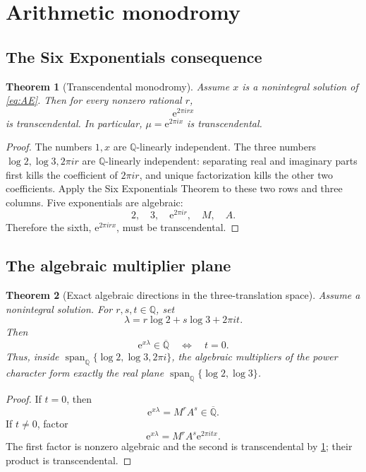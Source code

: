 \documentclass[11pt,oneside]{article}
\newtheorem{theorem}{Theorem}[section]
\theoremstyle{definition}
\theoremstyle{remark}
\newcommand{\Q}{\mathbb Q}
\newcommand{\Qbar}{\overline{\mathbb Q}}
\newcommand{\Span}{\operatorname{span}}
\newcommand{\e}{\mathrm e}
\begin{document}
\section{Arithmetic monodromy}

\subsection{The Six Exponentials consequence}

\begin{theorem}[Transcendental monodromy]
\label{thm:monodromy}
Assume \(x\) is a nonintegral solution of \eqref{eq:AE}.  Then for every nonzero rational \(r\),
\[
  \e^{2\pi i r x}
\]
is transcendental.  In particular, \(\mu=\e^{2\pi ix}\) is transcendental.
\end{theorem}

\begin{proof}
The numbers \(1,x\) are \(\Q\)-linearly independent.  The three numbers
\(\log2,\log3,2\pi ir\) are \(\Q\)-linearly independent: separating real and imaginary parts first kills the coefficient of \(2\pi ir\), and unique factorization kills the other two coefficients.  Apply the Six Exponentials Theorem to these two rows and three columns.  Five exponentials are algebraic:
\[
  2,\quad3,\quad \e^{2\pi ir},\quad M,\quad A.
\]
Therefore the sixth, \(\e^{2\pi irx}\), must be transcendental.
\end{proof}

\subsection{The algebraic multiplier plane}

\begin{theorem}[Exact algebraic directions in the three-translation space]
\label{thm:multiplier-plane}
Assume a nonintegral solution.  For \(r,s,t\in\Q\), set
\[
  \lambda=r\log2+s\log3+2\pi it.
\]
Then
\[
  \e^{x\lambda}\in\Qbar
  \quad\Longleftrightarrow\quad t=0.
\]
Thus, inside
\(\Span_{\Q}\{\log2,\log3,2\pi i\}\), the algebraic multipliers of the power character form exactly the real plane
\(\Span_{\Q}\{\log2,\log3\}\).
\end{theorem}

\begin{proof}
If \(t=0\), then
\[
  \e^{x\lambda}=M^rA^s\in\Qbar.
\]
If \(t\ne0\), factor
\[
  \e^{x\lambda}=M^rA^s\e^{2\pi itx}.
\]
The first factor is nonzero algebraic and the second is transcendental by \cref{thm:monodromy}; their product is transcendental.
\end{proof}
\end{document}
